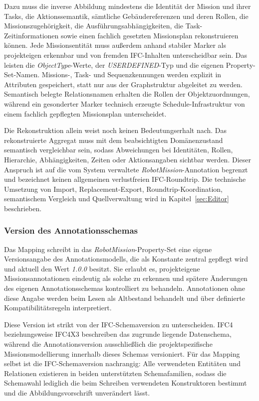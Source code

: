 Dazu muss die inverse Abbildung mindestens die Identität der Mission und ihrer Tasks, die
Aktionssemantik, sämtliche Gebäudereferenzen und deren Rollen, die Missionszugehörigkeit, die
Ausführungsabhängigkeiten, die Task-Zeitinformationen sowie einen fachlich gesetzten Missionsplan
rekonstruieren können. Jede Missionsentität muss außerdem anhand stabiler Marker als projekteigen
erkennbar und von fremden IFC-Inhalten unterscheidbar sein. Das leisten die
\textit{ObjectType}-Werte, der \textit{USERDEFINED}-Typ und die eigenen Property-Set-Namen. Missions-,
Task- und Sequenzkennungen werden explizit in Attributen gespeichert, statt nur aus der
Graphstruktur abgeleitet zu werden. Semantisch belegte Relationsnamen erhalten die Rollen der
Objektzuordnungen, während ein gesonderter Marker technisch erzeugte Schedule-Infrastruktur von
einem fachlich gepflegten Missionsplan unterscheidet.

Die Rekonstruktion allein weist noch keinen Bedeutungserhalt nach. Das rekonstruierte Aggregat muss
mit dem beabsichtigten Domänenzustand semantisch vergleichbar sein, sodass Abweichungen bei
Identitäten, Rollen, Hierarchie, Abhängigkeiten, Zeiten oder Aktionsangaben sichtbar werden. Dieser
Anspruch ist auf die vom System verwaltete \textit{RobotMission}-Annotation begrenzt und bezeichnet
keinen allgemeinen verlustfreien IFC-Roundtrip. Die technische Umsetzung von Import,
Replacement-Export, Roundtrip-Koordination, semantischem Vergleich und Quellverwaltung wird in
Kapitel~\ref{sec:Editor} beschrieben.

\subsubsection{Version des Annotationsschemas}

Das Mapping schreibt in das \textit{RobotMission}-Property-Set eine eigene Versionsangabe des
Annotationsmodells, die als Konstante zentral gepflegt wird und aktuell den Wert \textit{1.0.0}
besitzt. Sie erlaubt es, projekteigene Missionsannotationen eindeutig als solche zu erkennen und
spätere Änderungen des eigenen Annotationsschemas kontrolliert zu behandeln. Annotationen ohne diese
Angabe werden beim Lesen als Altbestand behandelt und über definierte Kompatibilitätsregeln
interpretiert.

Diese Version ist strikt von der IFC-Schemaversion zu unterscheiden. IFC4 beziehungsweise IFC4X3
beschreiben das zugrunde liegende Datenschema, während die Annotationsversion ausschließlich die
projektspezifische Missionsmodellierung innerhalb dieses Schemas versioniert. Für das Mapping selbst
ist die IFC-Schemaversion nachrangig: Alle verwendeten Entitäten und Relationen existieren in beiden
unterstützten Schemafamilien, sodass die Schemawahl lediglich die beim Schreiben verwendeten
Konstruktoren bestimmt und die Abbildungsvorschrift unverändert lässt.

